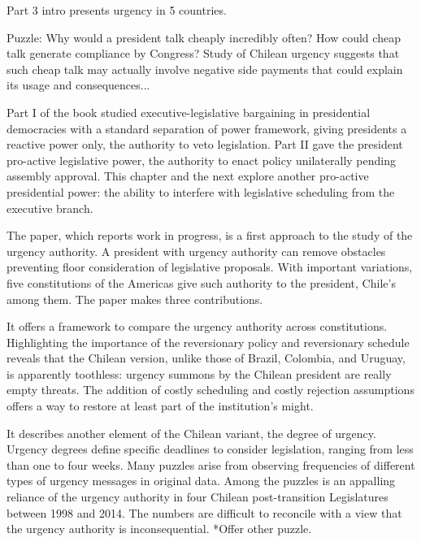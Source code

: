 \documentclass[letter,12pt]{article}
\begin{document}
\onehalfspacing

Part 3 intro presents urgency in 5 countries. 

Puzzle: Why would a president talk cheaply incredibly often? How could cheap talk generate compliance by Congress? Study of Chilean urgency suggests that such cheap talk may actually involve negative side payments that could explain its usage and consequences...



\noindent Part I of the book studied executive-legislative bargaining in presidential democracies with a standard separation of power framework, giving presidents a reactive power only, the authority to veto legislation. Part II gave the president pro-active legislative power, the authority to enact policy unilaterally pending assembly approval. This chapter and the next explore another pro-active presidential power: the ability to interfere with legislative scheduling from the executive branch. 

The paper, which reports work in progress, is a first approach to the study of the urgency authority. A president with urgency authority can remove obstacles preventing floor consideration of legislative proposals. With important variations, five constitutions of the Americas give such authority to the president, Chile's among them. The paper makes three contributions. 

It offers a framework to compare the urgency authority across constitutions. Highlighting the importance of the reversionary policy and reversionary schedule reveals that the Chilean version, unlike those of Brazil, Colombia, and Uruguay, is apparently toothless: urgency summons by the Chilean president are really empty threats. The addition of costly scheduling and costly rejection assumptions offers a way to restore at least part of the institution's might. 

It describes another element of the Chilean variant, the degree of urgency. Urgency degrees define specific deadlines to consider legislation, ranging from less than one to four weeks. Many puzzles arise from observing frequencies of different types of urgency messages in original data. Among the puzzles is an appalling reliance of the urgency authority in four Chilean post-transition Legislatures between 1998 and 2014. The numbers are difficult to reconcile with a view that the urgency authority is inconsequential. *Offer other puzzle. 
\end{document}
